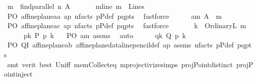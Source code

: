 \begin{isabellebody}
\ {\isacharquery}{\kern0pt}m\ {\isacharequal}{\kern0pt}\ {\isachardoublequoteopen}find{\isacharunderscore}{\kern0pt}parallel\ n\ A{\isachardoublequoteclose}\ \isanewline
\ \ \ \ \isamarkupfalse%
\ m{\isacharunderscore}{\kern0pt}line{\isacharcolon}{\kern0pt}\ {\isachardoublequoteopen}{\isacharquery}{\kern0pt}m\ {\isasymin}\ Lines{\isachardoublequoteclose}\ \isamarkupfalse%
\ PO\ affine{\isacharunderscore}{\kern0pt}plane{\isachardot}{\kern0pt}a{}a\ ap\ n{\isacharunderscore}{\kern0pt}facts\ pPdef\ pq{\isacharunderscore}{\kern0pt}pts\ \isamarkupfalse%
\ fastforce\isanewline
\ \ \ \ \isamarkupfalse%
\ am{\isacharcolon}{\kern0pt}\ {\isachardoublequoteopen}A\ {\isasymlhd}\ {\isacharquery}{\kern0pt}m{\isachardoublequoteclose}\ \isamarkupfalse%
\ PO\ affine{\isacharunderscore}{\kern0pt}plane{\isachardot}{\kern0pt}a{}c\ ap\ n{\isacharunderscore}{\kern0pt}facts\ pPdef\ pq{\isacharunderscore}{\kern0pt}pts\ \isamarkupfalse%
\ fastforce\ \isanewline
\ \ \ \ \isamarkupfalse%
\ {\isacharquery}{\kern0pt}k\ {\isacharequal}{\kern0pt}\ {\isachardoublequoteopen}OrdinaryL\ {\isacharquery}{\kern0pt}m{\isachardoublequoteclose}\isanewline
\ \ \ \ \isamarkupfalse%
\ pk{\isacharcolon}{\kern0pt}\ {\isachardoublequoteopen}P\ p{\isasymlhd}\ {\isacharquery}{\kern0pt}k{\isachardoublequoteclose}\ \isamarkupfalse%
\ \ PO\ am\ assms\ \isamarkupfalse%
\ auto\isanewline
\ \ \ \ \isamarkupfalse%
\ qk{\isacharcolon}{\kern0pt}\ {\isachardoublequoteopen}Q\ p{\isasymlhd}\ {\isacharquery}{\kern0pt}k{\isachardoublequoteclose}\ \isamarkupfalse%
\ PO\ QI\ affine{\isacharunderscore}{\kern0pt}plane{\isachardot}{\kern0pt}a{}b\ affine{\isacharunderscore}{\kern0pt}plane{\isacharunderscore}{\kern0pt}data{\isachardot}{\kern0pt}line{\isacharunderscore}{\kern0pt}pencil{\isacharunderscore}{\kern0pt}def\ ap\ assms\ n{\isacharunderscore}{\kern0pt}facts\ pPdef\ pq{\isacharunderscore}{\kern0pt}pts\ \isanewline
\ \ \ \ \isamarkupfalse%
\ {\isacharparenleft}{\kern0pt}smt\ {\isacharparenleft}{\kern0pt}verit{\isacharcomma}{\kern0pt}\ best{\isacharparenright}{\kern0pt}\ Un{\isacharunderscore}{\kern0pt}iff\ mem{\isacharunderscore}{\kern0pt}Collect{\isacharunderscore}{\kern0pt}eq\ mprojectivize{\isachardot}{\kern0pt}simps{\isacharparenleft}{\kern0pt}{}{\isacharparenright}{\kern0pt}\ projPoint{\isachardot}{\kern0pt}distinct{\isacharparenleft}{\kern0pt}{}{\isacharparenright}{\kern0pt}\ projPoint{\isachardot}{\kern0pt}inject{\isacharparenleft}{\kern0pt}{}{\isacharparenright}{\kern0pt}{\isacharparenright}{\kern0pt}\isanewline

\end{isabellebody}
